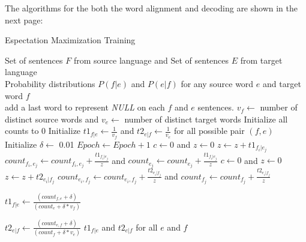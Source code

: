 \documentclass[11pt]{article}
\begin{document}
The algorithms for the both the word alignment and decoding are shown in the next page:	

\begin{algorithm}[htb]
	\renewcommand{\algorithmicrequire}{\textbf{Input:}\hspace{10.7pt}}
	\renewcommand\algorithmicensure {\textbf{Output:} }
	\caption{Espectation Maximization Training}
	\label{alg:pbg}
		\begin{algorithmic}[1]
		\vspace{3pt}
		\REQUIRE
		Set of sentences $F$ from source language and
		Set of sentences $E$ from target language\\
		\ENSURE 
		Probability distributions $P(f|e)$ and $P(e|f)$ 
		for any source word $e$ and target word $f$\\
		\STATE add a last word to represent \textit{NULL} on each $f$ and $e$ sentences.
		\STATE $v_f \gets$ number of distinct source words and $v_e \gets$ number of distinct target words
		\STATE Initialize all counts to 0
		\STATE Initialize $t1_{f|e}\gets \frac{1}{v_f}$ and $t2_{e|f}\gets \frac{1}{v_e}$
		for all possible pair $(f,e)$
		\STATE Initialize $\delta \gets$ 0.01  
		  \STATE $Epoch \gets Epoch+1$
			  \STATE $c \gets 0$ and $z \gets 0$
			    \STATE  $z \gets z + t1_{f_i|e_j}$ 
			  \ENDFOR
			    \STATE $count_{f_i,e_j} \gets count_{f_i,e_j}+\frac{t1_{f_i|e_j}}{z}$ and $count_{e_j} \gets count_{e_j}+\frac{t1_{f_i|e_j}}{z}$ 
			  \ENDFOR
			\ENDFOR
			  \STATE $c \gets 0$ and $z \gets 0$
			     \STATE  $z \gets z + t2_{e_i|f_j}$
			  \ENDFOR
			    \STATE $count_{e_i,f_j} \gets count_{e_i,f_j}+\frac{t2_{e_i|f_j}}{z}$ and $count_{f_j} \gets count_{f_j}+\frac{t2_{e_i|f_j}}{z}$
			  \ENDFOR
			\ENDFOR
		  \ENDFOR
		  
		    \STATE $t1_{f|e} \gets \frac{(count_{f,e} + \delta)}{(count_{e} + \delta * v_f)}$
		  \ENDFOR
		  
		    \STATE $t2_{e|f} \gets \frac{(count_{e,f} + \delta)}{(count_{f} + \delta * v_e)}$
		  \ENDFOR
		\ENDWHILE 
	  \RETURN $t1_{f|e}$ and $t2_{e|f}$ for all $e$ and $f$
	\end{algorithmic}
\end{algorithm}
\end{document}
